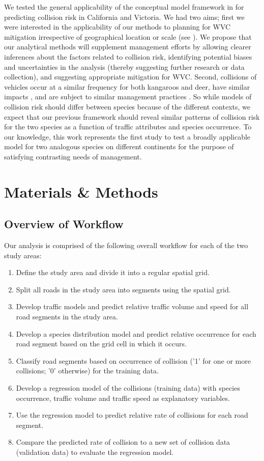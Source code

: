 We tested the general applicability of the conceptual model framework in  for predicting collision risk in California and Victoria.  We had two aims; first we were interested in the applicability of our methods to planning for WVC mitigation irrespective of geographical location or scale (see \cite{rvdr11}).  We propose that our analytical methods will supplement management efforts by allowing clearer inferences about the factors related to collision risk, identifying potential biases and uncertainties in the analysis (thereby suggesting further research or data collection), and suggesting appropriate mitigation for WVC.  Second, collisions of vehicles occur at a similar frequency for both kangaroos and deer, have similar impacts \citep{lang08}, and are subject to similar management practices \citep{mcsh97,crof04}.  So while models of collision risk should differ between species because of the different contexts, we expect that our previous framework should reveal similar patterns of collision risk for the two species as a function of traffic attributes and species occurrence.  To our knowledge, this work represents the first study to test a broadly applicable model for two analogous species on different continents for the purpose of satisfying contrasting needs of management.

\section{Materials \& Methods}

\subsection{Overview of Workflow}

Our analysis is comprised of the following overall workflow for each of the two study areas:

\begin{enumerate}
	\item Define the study area and divide it into a regular spatial grid.
	\item Split all roads in the study area into segments using the spatial grid.
	\item Develop traffic models and predict relative traffic volume and speed for all road segments in the study area.
	\item Develop a species distribution model and predict relative occurrence for each road segment based on the grid cell in which it occurs.
	\item Classify road segments based on occurrence of collision ('1' for one or more collisions; '0' otherwise) for the training data.
	\item Develop a regression model of the collisions (training data) with species occurrence, traffic volume and traffic speed as explanatory variables.
	\item Use the regression model to predict relative rate of collisions for each road segment.
	\item Compare the predicted rate of collision to a new set of collision data (validation data) to evaluate the regression model.
\end{enumerate}	

